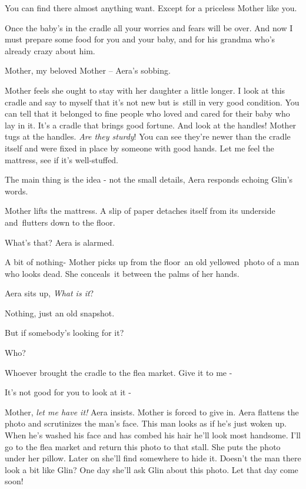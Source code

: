 \documentclass[letterpaper]{article}
\begin{document}
{\textquotedbl}You can find there almost anything want. Except for a priceless Mother like you.{\textquotedbl} 

{\textquotedbl}Once the baby's in the cradle all your worries and fears will be over. And now I must prepare some food
for you and your baby, and for his grandma who's already crazy about him.{\textquotedbl} 

{\textquotedbl}Mother, my beloved Mother --{\textquotedbl} Aera{}'s  sobbing. ~

Mother feels she ought to stay with her daughter a little longer. {\textquotedbl}I look at this cradle and say to myself
that it's not new but is\textcolor{red}{\ }still in very good condition. You can tell that it belonged to fine people
who loved and cared for their baby who lay in it. It's a cradle that brings good fortune. And look at the
handles!{\textquotedbl} Mother tugs at the handles. {\textquotedbl}\textit{Are they sturdy}! You can see they're newer
than the cradle itself and were fixed in place by someone with good hands. Let me feel the mattress, see if it's
well-stuffed.{\textquotedbl} 

{\textquotedbl}The main thing is the idea - not the small details,{\textquotedbl} Aera responds echoing Glin's words. 

Mother lifts the mattress. A slip of paper detaches itself from its underside and\textcolor{red}{\ }flutters down to the
floor. 

{\textquotedbl}What's that?{\textquotedbl} Aera is alarmed. 

A bit of nothing-{\textquotedbl} Mother picks up from the floor~an old yellowed\ photo of a man who looks dead. She
conceals\textcolor{red}{\ }it between the palms of her hands. 

Aera sits up, {\textquotedbl}\textit{What is it}?{\textquotedbl}~ 

{\textquotedbl}Nothing, just an old snapshot.{\textquotedbl} 

{\textquotedbl}But if somebody's looking for it?{\textquotedbl} 

{\textquotedbl}Who?{\textquotedbl} 

{\textquotedbl}Whoever brought the cradle to the flea market. Give it to me -{\textquotedbl} 

{\textquotedbl}It's not good for you to look at it -{\textquotedbl} 

{\textquotedbl}Mother, \textit{let me have it!}{\textquotedbl} Aera insists. Mother is forced to give in. Aera flattens
the photo and scrutinizes the man's face. {\textquotedbl}This man looks as if he's just woken up. When he's washed his
face and has combed his hair he'll look most handsome. I'll go to the flea market and return this photo to that
stall.{\textquotedbl} She puts the photo under her pillow. Later on she'll find somewhere to hide it. Doesn't the man
there look a bit like Glin? One day she'll ask Glin about this photo.  Let that day come soon!
\end{document}
